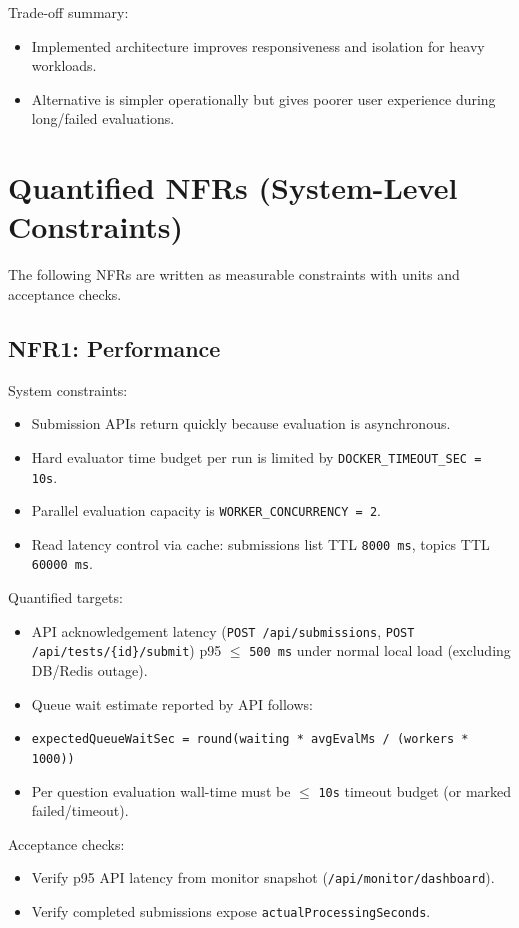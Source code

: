 \documentclass[12pt,journal,onecolumn]{IEEEtran}
\begin{document}
Trade-off summary:
\begin{itemize}
    \item Implemented architecture improves responsiveness and isolation for heavy workloads.
    \item Alternative is simpler operationally but gives poorer user experience during long/failed evaluations.
\end{itemize}

\section{Quantified NFRs (System-Level Constraints)}

The following NFRs are written as measurable constraints with units and acceptance checks.

\subsection{NFR1: Performance}

System constraints:
\begin{itemize}
    \item Submission APIs return quickly because evaluation is asynchronous.
    \item Hard evaluator time budget per run is limited by \texttt{DOCKER\_TIMEOUT\_SEC = 10s}.
    \item Parallel evaluation capacity is \texttt{WORKER\_CONCURRENCY = 2}.
    \item Read latency control via cache: submissions list TTL \texttt{8000 ms}, topics TTL \texttt{60000 ms}.
\end{itemize}

Quantified targets:
\begin{itemize}
    \item API acknowledgement latency (\texttt{POST /api/submissions}, \texttt{POST /api/tests/\{id\}/submit}) p95 $\leq$ \texttt{500 ms} under normal local load (excluding DB/Redis outage).
    \item Queue wait estimate reported by API follows:
    \item \texttt{expectedQueueWaitSec = round(waiting * avgEvalMs / (workers * 1000))}
    \item Per question evaluation wall-time must be $\leq$ \texttt{10s} timeout budget (or marked failed/timeout).
\end{itemize}

Acceptance checks:
\begin{itemize}
    \item Verify p95 API latency from monitor snapshot (\texttt{/api/monitor/dashboard}).
    \item Verify completed submissions expose \texttt{actualProcessingSeconds}.
\end{itemize}
\end{document}
